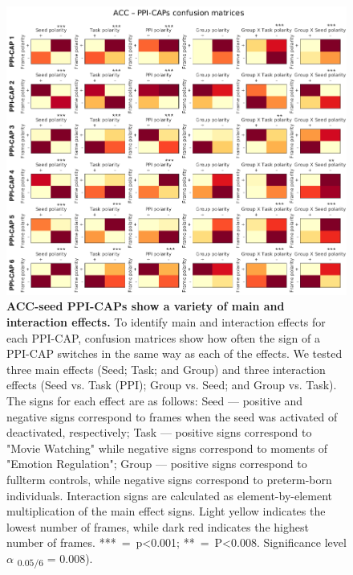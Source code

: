 \begin{figure}[h!]
\centering
\includegraphics[width=1\textwidth]{images/Ch5/Ch5_ACC_cm.png}
\caption{\textbf{ACC-seed PPI-CAPs show a variety of main and interaction effects.} To identify main and interaction effects for each PPI-CAP, confusion matrices show how often the sign of a PPI-CAP switches in the same way as each of the effects. We tested three main effects (Seed; Task; and Group) and three interaction effects (Seed vs. Task (PPI); Group vs. Seed; and Group vs. Task). The signs for each effect are as follows: Seed --- positive and negative signs correspond to frames when the seed was activated of deactivated, respectively;  Task --- positive signs correspond to "Movie Watching" while negative signs correspond to moments of "Emotion Regulation"; Group --- positive signs correspond to fullterm controls, while negative signs correspond to preterm-born individuals. Interaction signs are calculated as element-by-element multiplication of the main effect signs. Light yellow indicates the lowest number of frames, while dark red indicates the highest number of frames. ***~=~p<0.001; **~=~P<0.008. Significance level $\alpha$ \textsubscript{$0.05/6$} = 0.008).}
\label{fig:acc_cm}
\end{figure}


